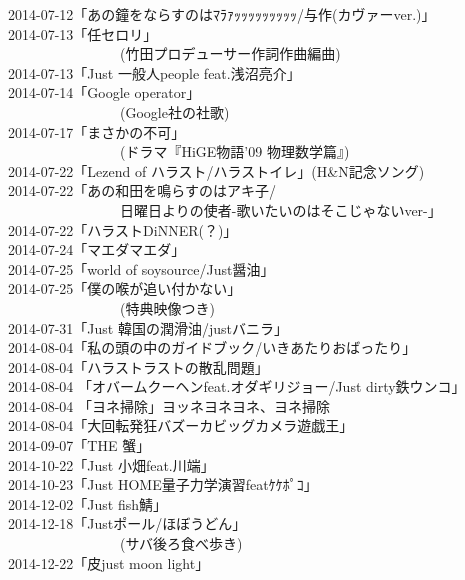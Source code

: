 2014-07-12「あの鐘をならすのはﾏﾗｧｯｯｯｯｯｯｯｯｯ/与作(カヴァーver.)」 \\
2014-07-13「任セロリ」\\
 \ \ \ \ \ \ \ \ \ \ \ \ \ \ \ \ (竹田プロデューサー作詞作曲編曲) \\
2014-07-13「Just 一般人people feat.浅沼亮介」 \\
2014-07-14「Google operator」\\
 \ \ \ \ \ \ \ \ \ \ \ \ \ \ \ \ (Google社の社歌)\\ 
2014-07-17「まさかの不可」\\
 \ \ \ \ \ \ \ \ \ \ \ \ \ \ \ \ (ドラマ『HiGE物語’09 物理数学篇』) \\
2014-07-22「Lezend of ハラスト/ハラストイレ」(H\&N記念ソング) \\
2014-07-22「あの和田を鳴らすのはアキ子/\\
 \ \ \ \ \ \ \ \ \ \ \ \ \ \ \ \ 日曜日よりの使者-歌いたいのはそこじゃないver-」 \\
2014-07-22「ハラストDiNNER(？)」 \\
2014-07-24「マエダマエダ」 \\
2014-07-25「world of soysource/Just醤油」\\ 
2014-07-25「僕の喉が追い付かない」\\
 \ \ \ \ \ \ \ \ \ \ \ \ \ \ \ \ (特典映像つき)\\ 
2014-07-31「Just 韓国の潤滑油/justバニラ」 \\
2014-08-04「私の頭の中のガイドブック/いきあたりおばったり」 \\
2014-08-04「ハラストラストの散乱問題」 \\
2014-08-04 「オバームクーヘンfeat.オダギリジョー/Just dirty鉄ウンコ」\\ 
2014-08-04 「ヨネ掃除」ヨッネヨネヨネ、ヨネ掃除 \\
2014-08-04「大回転発狂バズーカビッグカメラ遊戯王」\\ 
2014-09-07「THE 蟹」 \\
2014-10-22「Just 小畑feat.川端」\\ 
2014-10-23「Just HOME量子力学演習featｹｹﾎﾟｺ」\\ 
2014-12-02「Just fish鯖」 \\
2014-12-18「Justポール/ほぼうどん」\\
 \ \ \ \ \ \ \ \ \ \ \ \ \ \ \ \ (サバ後ろ食べ歩き)\\ 
2014-12-22「皮just moon light」 \\

